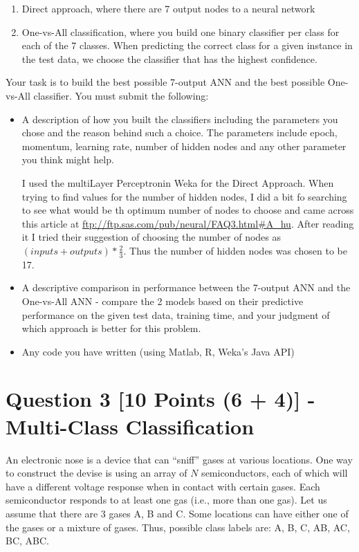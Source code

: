 \documentclass[fontsize=10pt,DIV=14]{scrartcl}
\begin{document}
	\begin{enumerate}
		\item
		Direct approach, where there are 7 output nodes to a neural network

		\item
		One-vs-All classiﬁcation, where you build one binary classiﬁer per class for each of the 7 classes. When predicting the correct class for a given instance in the test data, we choose the classiﬁer that has the highest conﬁdence.

	\end{enumerate}

	Your task is to build the best possible 7-output ANN and the best possible One-vs-All classiﬁer. You must submit the following:

	\begin{itemize}
		\item
		A description of how you built the classiﬁers including the parameters you chose and the reason behind such a choice. The parameters include epoch, momentum, learning rate, number of hidden nodes and any other parameter you think might help.

		I used the multiLayer Perceptronin Weka for the Direct Approach. When trying to find values for the number of hidden nodes, I did a bit fo searching to see what would be th optimum number of nodes to choose and came across this article at \url{ftp://ftp.sas.com/pub/neural/FAQ3.html#A_hu}. After reading it I tried their suggestion of choosing the number of nodes as $( inputs + outputs) * \frac{2}{3}$. Thus the number of hidden nodes was chosen to be 17.

		\item
		A descriptive comparison in performance between the 7-output ANN and the One-vs-All ANN - compare the 2 models based on their predictive performance on the given test data, training time, and your judgment of which approach is better for this problem.

		\item
		Any code you have written (using Matlab, R, Weka’s Java API)
	\end{itemize}

	\section{Question 3 [10 Points (6 + 4)] - Multi-Class Classification}


	An electronic nose is a device that can ``sniff'' gases at various locations. One way to construct the devise is using an array of $N$ semiconductors, each of which will have a different voltage response when in contact with certain gases. Each semiconductor responds to at least one gas (i.e., more than one gas). Let us assume that there are 3 gases A, B and C. Some locations can have either one of the gases or a mixture of gases. Thus, possible class labels are: A, B, C, AB, AC, BC, ABC.
\end{document}

